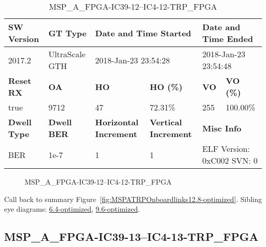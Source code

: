 \begin{table}[h]
\centering
\caption{MSP\_A\_FPGA-IC39-12--IC4-12-TRP\_FPGA}
\label{tab:MSPAFPGAIC3912IC412TRPFPGA12.8-optimized}
\begin{tabular}{@{}|l|l|l|l|l|l|@{}}
\toprule
\textbf{SW Version}                & \textbf{GT Type}   & \multicolumn{2}{l|}{\textbf{Date and Time Started}}            & \multicolumn{2}{l|}{\textbf{Date and Time Ended}}        \\ \midrule
2017.2                       & UltraScale GTH          & \multicolumn{2}{l|}{2018-Jan-23 23:54:28}                   & \multicolumn{2}{l|}{2018-Jan-23 23:54:48}               \\ \midrule
\textbf{Reset RX}                  & \textbf{OA} & \textbf{HO}   & \textbf{HO (\%)} & \textbf{VO} & \textbf{VO (\%)} \\ \midrule
true & 9712        & 47          & 72.31\%        & 255        & 100.00\%       \\ \midrule
\textbf{Dwell Type}                & \textbf{Dwell BER} & \textbf{Horizontal Increment} & \textbf{Vertical Increment}    & \multicolumn{2}{l|}{\textbf{Misc Info}}                  \\ \midrule
BER                            & 1e-7        & 1        & 1           & \multicolumn{2}{l|}{ELF Version: 0xC002 SVN: 0}                         \\ \bottomrule
\end{tabular}
\end{table}

\begin{figure}[h]
\caption{MSP\_A\_FPGA-IC39-12--IC4-12-TRP\_FPGA} \label{fig:MSPAFPGAIC3912IC412TRPFPGA12.8-optimized}
\end{figure}

Call back to summary Figure~\ref{fig:MSPATRPOnboardlinks12.8-optimized}.
Sibling eye diagrams: \hyperref[sec:MSPAFPGAIC3912IC412TRPFPGA6.4-optimized]{6.4-optimized}, \hyperref[sec:MSPAFPGAIC3912IC412TRPFPGA9.6-optimized]{9.6-optimized}.

\clearpage
\newpage


\subsection{MSP\_A\_FPGA-IC39-13--IC4-13-TRP\_FPGA}\label{sec:MSPAFPGAIC3913IC413TRPFPGA12.8-optimized}

